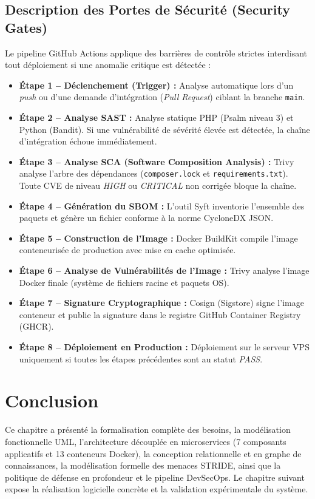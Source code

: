 \subsection{Description des Portes de S\'ecurit\'e (Security Gates)}
\par Le pipeline GitHub Actions applique des barri\`eres de contr\^ole strictes interdisant tout d\'eploiement si une anomalie critique est d\'etect\'ee :
\begin{itemize}
    \item \textbf{\'Etape 1 -- D\'eclenchement (Trigger) :} Analyse automatique lors d'un \textit{push} ou d'une demande d'int\'egration (\textit{Pull Request}) ciblant la branche \texttt{main}.
    \item \textbf{\'Etape 2 -- Analyse SAST :} Analyse statique PHP (Psalm niveau 3) et Python (Bandit). Si une vuln\'erabilit\'e de s\'ev\'erit\'e \'elev\'ee est d\'etect\'ee, la cha\^ine d'int\'egration \'echoue imm\'ediatement.
    \item \textbf{\'Etape 3 -- Analyse SCA (Software Composition Analysis) :} Trivy analyse l'arbre des d\'ependances (\texttt{composer.lock} et \texttt{requirements.txt}). Toute CVE de niveau \textit{HIGH} ou \textit{CRITICAL} non corrig\'ee bloque la cha\^ine.
    \item \textbf{\'Etape 4 -- G\'en\'eration du SBOM :} L'outil Syft inventorie l'ensemble des paquets et g\'en\`ere un fichier conforme \`a la norme CycloneDX JSON.
    \item \textbf{\'Etape 5 -- Construction de l'Image :} Docker BuildKit compile l'image conteneuris\'ee de production avec mise en cache optimis\'ee.
    \item \textbf{\'Etape 6 -- Analyse de Vuln\'erabilit\'es de l'Image :} Trivy analyse l'image Docker finale (syst\`eme de fichiers racine et paquets OS).
    \item \textbf{\'Etape 7 -- Signature Cryptographique :} Cosign (Sigstore) signe l'image conteneur et publie la signature dans le registre GitHub Container Registry (GHCR).
    \item \textbf{\'Etape 8 -- D\'eploiement en Production :} D\'eploiement sur le serveur VPS uniquement si toutes les \'etapes pr\'ec\'edentes sont au statut \textit{PASS}.
\end{itemize}

\section*{Conclusion}
\par Ce chapitre a pr\'esent\'e la formalisation compl\`ete des besoins, la mod\'elisation fonctionnelle UML, l'architecture d\'ecoupl\'ee en microservices (7 composants applicatifs et 13 conteneurs Docker), la conception relationnelle et en graphe de connaissances, la mod\'elisation formelle des menaces STRIDE, ainsi que la politique de d\'efense en profondeur et le pipeline DevSecOps. Le chapitre suivant expose la r\'ealisation logicielle concr\`ete et la validation exp\'erimentale du syst\`eme.
